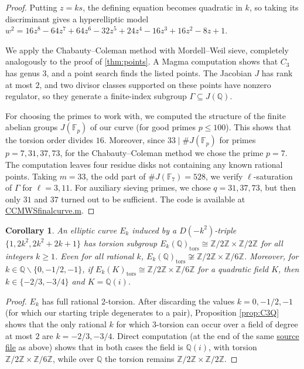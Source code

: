 \documentclass{article}
\theoremstyle{plain}
\newtheorem{corollary}[theorem]{Corollary}
\newcommand{\Z}{\mathbb{Z}}
\newcommand{\Q}{\mathbb{Q}}
\newcommand{\F}{\mathbb{F}}
\newcommand{\twotimessix}{\Z/2\Z \times \Z/6\Z}
\newcommand{\tors}{\mathrm{tors}}
\begin{document}
\begin{proof}
Putting \(z=ks\), the defining equation becomes quadratic in \(k\), so taking its discriminant gives a hyperelliptic model
\( w^2 = 16z^8 - 64z^7 + 64z^6 - 32z^5 + 24z^4 - 16z^3 + 16z^2 - 8z + 1\).

    We apply the Chabauty--Coleman method with Mordell--Weil sieve, completely analogously to the proof of \cref{thm:points}. A {\sc Magma} computation shows that \(C_3\) has genus \(3\), and a point search finds the listed points. The Jacobian \(J\) has rank at most \(2\),
and two divisor classes supported on these points have nonzero regulator, so they generate a finite-index subgroup \(\Gamma \subseteq J(\Q)\).

For choosing the primes to work with, we computed the structure of the finite abelian groups \(J(\F_p)\) of our curve (for good primes \(p \leqslant 100\)). This shows that the torsion order divides \(16\). Moreover, since
\( 33\mid \#J(\F_p) \) for primes \(p=7, 31, 37, 73\), for the Chabauty--Coleman method we chose the prime \(p=7\). The computation leaves four residue disks not containing any known rational points. Taking \(m=33\), the odd part of \(\#J(\F_7)=528\), we verify \(\ell\)-saturation of \(\Gamma\) for \( \ell = 3, 11\). For auxiliary sieving primes, we chose \(q=31, 37, 73\), but then only \(31\) and \(37\) turned out to be sufficient. The code is available at \href{https://github.com/NikolaAdzaga/TorsionRegularTriples/blob/main/CC_MWS_final_curve.m}{CC\textunderscore MWS\textunderscore final\textunderscore curve.m}.
\end{proof}

    \begin{corollary}
        An elliptic curve \(E_k\) induced by a \(D(-k^2)\)-triple \( \{1, 2k^2, 2k^2+2k+1\} \) has torsion subgroup \( E_k(\Q)_\tors \cong \Z/2\Z \times \Z/2\Z\) for all integers \(k\geqslant 1\).
     Even for all rational \(k\), \(E_k(\Q)_\tors \not\cong \twotimessix\). Moreover, for \(k\in\Q \backslash \{0, -1/2, -1\}\), if \(E_k(K)_\tors \cong \twotimessix\) for a quadratic field \(K\), then \(k\in \{-2/3, -3/4\}\) and \(K=\Q(i)\).
    \end{corollary}

    \begin{proof}
        \(E_k\) has full rational \(2\)-torsion. After discarding the values \(k=0, -1/2, -1\) (for which our starting triple degenerates to a pair), Proposition \ref{prop:C3Q} shows that the only rational \(k\) for which \(3\)-torsion can occur over a field of degree at most \(2\) are \(k=-2/3, -3/4\). Direct computation (at the end of the same \href{https://github.com/NikolaAdzaga/TorsionRegularTriples/blob/main/CC_MWS_final_curve.m}{source file} as above) shows that in both cases the field is \(\Q(i)\), with torsion \(\twotimessix\), while over \(\Q\) the torsion remains \(\Z/2\Z \times \Z/2\Z\).
        \end{proof}
\end{document}
